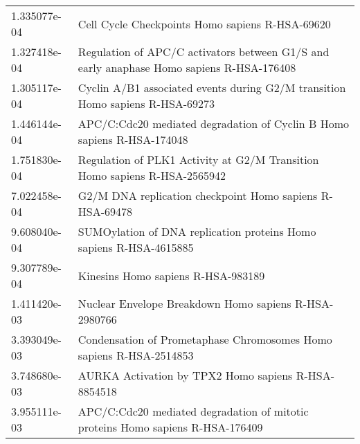 \begin{longtable}{p{2.4cm}p{14.5cm}}
             1.335077e-04 &                                                                                                        Cell Cycle Checkpoints Homo sapiens R-HSA-69620 \\
             1.327418e-04 &                                                               Regulation of APC/C activators between G1/S and early anaphase Homo sapiens R-HSA-176408 \\
             1.305117e-04 &                                                                          Cyclin A/B1 associated events during G2/M transition Homo sapiens R-HSA-69273 \\
             1.446144e-04 &                                                                                 APC/C:Cdc20 mediated degradation of Cyclin B Homo sapiens R-HSA-174048 \\
             1.751830e-04 &                                                                              Regulation of PLK1 Activity at G2/M Transition Homo sapiens R-HSA-2565942 \\
             7.022458e-04 &                                                                                               G2/M DNA replication checkpoint Homo sapiens R-HSA-69478 \\
             9.608040e-04 &                                                                                     SUMOylation of DNA replication proteins Homo sapiens R-HSA-4615885 \\
             9.307789e-04 &                                                                                                                     Kinesins Homo sapiens R-HSA-983189 \\
             1.411420e-03 &                                                                                                  Nuclear Envelope Breakdown Homo sapiens R-HSA-2980766 \\
             3.393049e-03 &                                                                                    Condensation of Prometaphase Chromosomes Homo sapiens R-HSA-2514853 \\
             3.748680e-03 &                                                                                                    AURKA Activation by TPX2 Homo sapiens R-HSA-8854518 \\
             3.955111e-03 &                                                                         APC/C:Cdc20 mediated degradation of mitotic proteins Homo sapiens R-HSA-176409 \\

\end{longtable}
